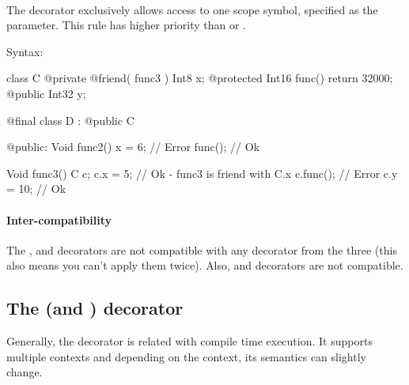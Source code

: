 \paragraph{} \label{decorator:friend} The  decorator exclusively allows access to one scope symbol, specified as the parameter. This rule has higher priority than  or .

Syntax: 

\begin{code}
class C {
	@private @friend( func3 ) Int8 x;
	@protected Int16 func() {
		return 32000;
	}	
	@public Int32 y;
}

@final class D : @public C {
	
@public:
	Void func2() {
		x = 6; // Error
		func(); // Ok
	}
	
}

Void func3() {
	C c;
	c.x = 5; // Ok - func3 is friend with C.x
	c.func(); // Error
	c.y = 10; // Ok
}
\end{code}

\paragraph{Inter-compatibility}
The ,  and  decorators are not compatible with any decorator from the three (this also means you can't apply them twice). Also,  and  decorators are not compatible.

\subsection{The  (and ) decorator} \label{decorator:ctime} \label{decorator:autoCtime}
Generally, the  decorator is related with compile time execution. It supports multiple contexts and depending on the context, its semantics can slightly change.

